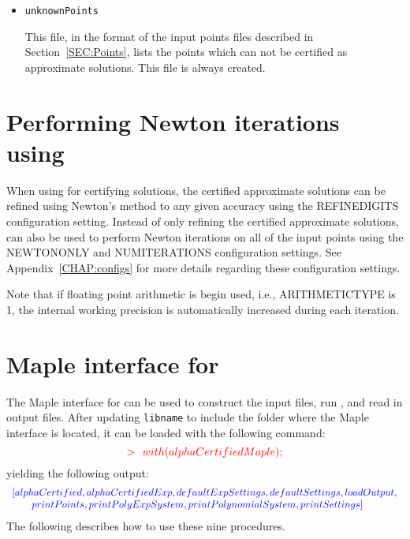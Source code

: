 \documentclass[11pt]{report}
\begin{document}
\begin{itemize}
\item {\tt unknownPoints}

This file, in the format of the input points files described in Section~\ref{SEC:Points},
lists the points which can not be certified as approximate solutions.
This file is always created.

\end{itemize}

\section{Performing Newton iterations using \alphaCertified}\label{CHAP:Newton}

When using \alphaCertifiedS for certifying solutions, the certified approximate
solutions can be refined using Newton's method to any given accuracy
using the REFINEDIGITS configuration setting.
Instead of only refining the certified approximate solutions, \alphaCertifiedS
can also be used to perform Newton iterations on all of the input points
using the NEWTONONLY and NUMITERATIONS configuration settings.
See Appendix~\ref{CHAP:configs} for more details regarding
these configuration settings.

Note that if floating point arithmetic is begin used, i.e., ARITHMETICTYPE is 1,
the internal working precision is automatically increased during each iteration.

\section{Maple interface for \alphaCertified}\label{CHAP:maple}

The Maple interface for \alphaCertifiedS can be used to construct
the input files, run \alphaCertified, and read in output files.
After updating {\tt libname} to include the folder where
the \alphaCertifiedS Maple interface is located, it can be loaded
with the following command:
\[
\begin{color}{red}{\bf >}~~with(alphaCertifiedMaple);\end{color}
\]
yielding the following output:
\[
\begin{color}{blue}
\begin{array}{l}
[alphaCertified, alphaCertifiedExp, defaultExpSettings, defaultSettings, loadOutput, \\
~~~~~~printPoints, printPolyExpSystem, printPolynomialSystem, printSettings]\end{array}\end{color}
\]
The following describes how to use these nine procedures.
\end{document}
